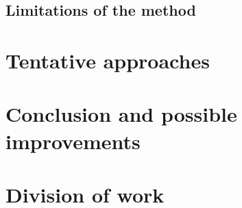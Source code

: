 \documentclass[11pt]{article}
\begin{document}
\subsection{Limitations of the method}


\section{Tentative approaches}


\section{Conclusion and possible improvements}


\section{Division of work}

\end{document}
